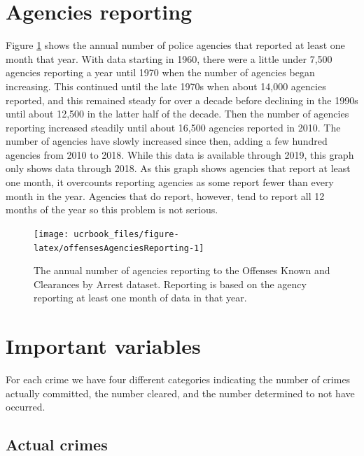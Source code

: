 \documentclass[
  12pt,
  openany]{book}
\begin{document}
\hypertarget{agencies-reporting}{%
\section{Agencies reporting}\label{agencies-reporting}}

Figure \ref{fig:offensesAgenciesReporting} shows the annual number of police agencies that reported at least one month that year. With data starting in 1960, there were a little under 7,500 agencies reporting a year until 1970 when the number of agencies began increasing. This continued until the late 1970s when about 14,000 agencies reported, and this remained steady for over a decade before declining in the 1990s until about 12,500 in the latter half of the decade. Then the number of agencies reporting increased steadily until about 16,500 agencies reported in 2010. The number of agencies have slowly increased since then, adding a few hundred agencies from 2010 to 2018. While this data is available through 2019, this graph only shows data through 2018. As this graph shows agencies that report at least one month, it overcounts reporting agencies as some report fewer than every month in the year. Agencies that do report, however, tend to report all 12 months of the year so this problem is not serious.

\begin{figure}

{\centering \texttt{[image: ucrbook\_files/figure-latex/offensesAgenciesReporting-1]} 

}

\caption{The annual number of agencies reporting to the Offenses Known and Clearances by Arrest dataset. Reporting is based on the agency reporting at least one month of data in that year.}\label{fig:offensesAgenciesReporting}
\end{figure}

\hypertarget{important-variables}{%
\section{Important variables}\label{important-variables}}

For each crime we have four different categories indicating the number of crimes actually committed, the number cleared, and the number determined to not have occurred.

\hypertarget{actual}{%
\subsection{Actual crimes}\label{actual}}
\end{document}
